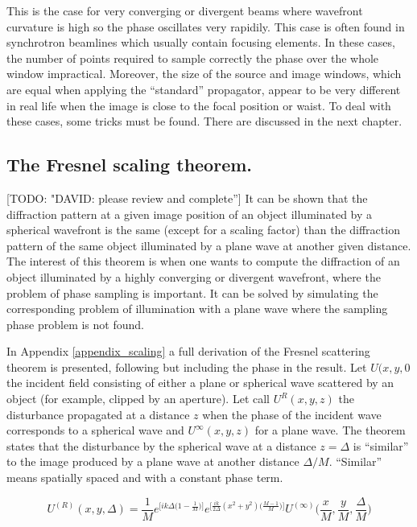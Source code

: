 \documentclass{iucr}              %
\newcommand{\todo}[1]{{\color{red}[TODO: "#1'']}}
\begin{document}
This is the case for very converging or divergent beams where wavefront curvature is high so the phase oscillates very rapidily. This case is often found in synchrotron beamlines which usually contain focusing elements. In these cases, the number of points required to sample correctly the phase over the whole window impractical. Moreover, the size of the source and image windows, which are equal when applying the ``standard'' propagator, appear to be very different in real life when the image is close to the focal position or waist. To deal with these cases, some tricks must be found. There are discussed in the next chapter.

\subsection{The Fresnel scaling theorem.}
\label{subch: Fresnel scaling}
\todo{DAVID: please review and complete}
It can be shown that the diffraction pattern at a given image position of an object illuminated by a spherical wavefront is the same (except for a scaling factor) than the diffraction pattern of the same object illuminated by a plane wave at another given distance. 
The interest of this theorem is when one wants to compute the diffraction of an object illuminated by a highly converging or divergent wavefront, where the problem of phase sampling is important. It can be solved by simulating the corresponding problem of illumination with a plane wave where the sampling phase problem is not found.

In Appendix \ref{appendix_scaling} a full derivation of the Fresnel scattering theorem is presented, following \cite{paganin_book} but including the phase in the result. Let $U(x,y,0$ the incident field consisting of either a plane or spherical wave scattered by an object (for example, clipped by an aperture). Let call $U^R(x,y,z)$ the disturbance propagated at a distance $z$ when the phase of the incident wave corresponds to a spherical wave and $U^\infty(x,y,z)$ for a plane wave. The theorem states that the disturbance by the spherical wave at a distance $z=\Delta$ is ``similar'' to the image produced by a plane wave at another distance $\Delta/M$. ``Similar'' means spatially spaced and with a constant phase term.

\begin{equation}
	U^{(R)}(x, y, \Delta)= \frac{1}{M} e^{\big[ik\Delta \big({1-\frac{1}{M}}\big)\big]} e^{\big[\frac{ik}{2\Delta}(x^2+y^2)\big(\frac{M-1}{M}\big)\big]} U^{(\infty)}\Big(\frac{x}{M}, \frac{y}{M}, \frac{\Delta}{M}\Big)
\end{equation}
\end{document}
